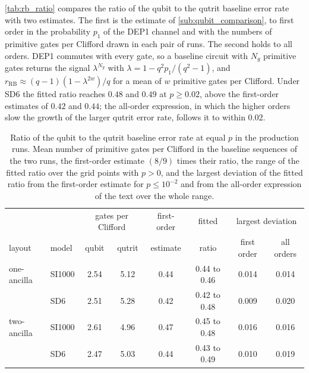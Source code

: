 \autoref{tab:rb_ratio} compares the ratio of the qubit to the qutrit baseline error rate with two estimates. The first is the estimate of \autoref{sub:qubit_comparison}, to first order in the probability $p_1$ of the DEP1 channel and with the numbers of primitive gates per Clifford drawn in each pair of runs. The second holds to all orders. DEP1 commutes with every gate, so a baseline circuit with $N_g$ primitive gates returns the signal $\lambda^{N_g}$ with $\lambda = 1 - q^2 p_1/(q^2 - 1)$, and $r_{\mathrm{RB}} \approx (q-1)(1 - \lambda^{2w})/q$ for a mean of $w$ primitive gates per Clifford. Under SD6 the fitted ratio reaches $0.48$ and $0.49$ at $p \ge 0.02$, above the first-order estimates of $0.42$ and $0.44$; the all-order expression, in which the higher orders slow the growth of the larger qutrit error rate, follows it to within $0.02$.

\begin{table}[tp]
  \centering
  \small
  \begin{tabular}{ll|cc|c|c|cc}
    \hline
    & & \multicolumn{2}{c|}{gates per Clifford} & first-order & fitted & \multicolumn{2}{c}{largest deviation} \\
    layout & model & qubit & qutrit & estimate & ratio & first order & all orders \\
    \hline
    one-ancilla & SI1000 & 2.54 & 5.12 & 0.44 & 0.44 to 0.46 & 0.014 & 0.014 \\
     & SD6 & 2.51 & 5.28 & 0.42 & 0.42 to 0.48 & 0.009 & 0.020 \\
    two-ancilla & SI1000 & 2.61 & 4.96 & 0.47 & 0.45 to 0.48 & 0.016 & 0.016 \\
     & SD6 & 2.47 & 5.03 & 0.44 & 0.43 to 0.49 & 0.010 & 0.019 \\
    \hline
  \end{tabular}
  \caption{Ratio of the qubit to the qutrit baseline error rate at equal $p$ in the production runs. Mean number of primitive gates per Clifford in the baseline sequences of the two runs, the first-order estimate $(8/9)$ times their ratio, the range of the fitted ratio over the grid points with $p > 0$, and the largest deviation of the fitted ratio from the first-order estimate for $p \le 10^{-2}$ and from the all-order expression of the text over the whole range.}
  \label{tab:rb_ratio}
\end{table}

